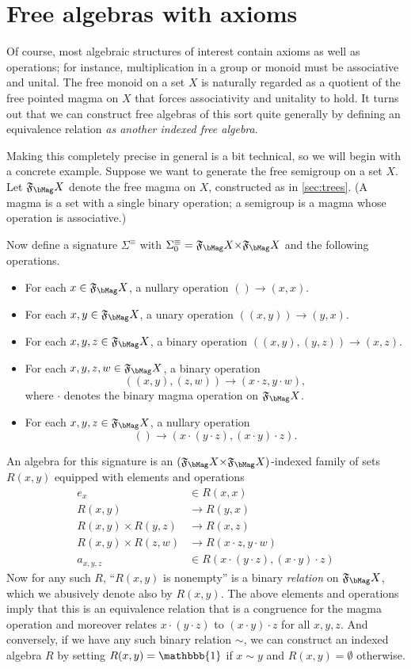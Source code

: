 \documentclass{book}
\def\sig{\Sigma}
\def\equivsym{\mathord{\equiv}}
\newcommand{\F}[1]{\mathfrak{F}_{#1}}
\def\unit{\mathbbb{1}}%
\begin{document}
\section{Free algebras with axioms}
\label{sec:axioms}

Of course, most algebraic structures of interest contain axioms as well as operations; for instance, multiplication in a group or monoid must be associative and unital.
The free monoid on a set $X$ is naturally regarded as a quotient of the free pointed magma on $X$ that forces associativity and unitality to hold.
It turns out that we can construct free algebras of this sort quite generally by defining an equivalence relation \emph{as another indexed free algebra}.

Making this completely precise in general is a bit technical, so we will begin with a concrete example.
Suppose we want to generate the free semigroup on a set $X$.
Let $\F\bMag X$ denote the free magma on $X$, constructed as in \cref{sec:trees}.
(A magma is a set with a single binary operation; a semigroup is a magma whose operation is associative.)

Now define a signature $\sig^{\equivsym}$ with $\sig^{\equivsym}_0 = \F\bMag X\times \F\bMag X$ and the following operations.
\begin{itemize}
\item For each $x\in \F\bMag X$, a nullary operation $() \to (x,x)$.
\item For each $x,y\in \F\bMag X$, a unary operation $((x,y)) \to (y,x)$.
\item For each $x,y,z\in \F\bMag X$, a binary operation $((x,y),(y,z)) \to (x,z)$.
\item For each $x,y,z,w\in \F\bMag X$, a binary operation \[((x,y),(z,w)) \to (x\cdot z,y\cdot w),\] where $\cdot$ denotes the binary magma operation on $\F\bMag X$.
\item For each $x,y,z\in \F\bMag X$, a nullary operation \[() \to (x\cdot (y\cdot z),(x\cdot y)\cdot z).\]
\end{itemize}
An algebra for this signature is an $(\F\bMag X\times \F\bMag X)$-indexed family of sets $R(x,y)$ equipped with elements and operations
\begin{align*}
  e_x &\in R(x,x)\\
  R(x,y) &\to R(y,x)\\
  R(x,y)\times R(y,z) &\to R(x,z)\\
  R(x,y) \times R(z,w) &\to R(x\cdot z,y\cdot w)\\
  a_{x,y,z} &\in R(x\cdot (y\cdot z),(x\cdot y)\cdot z)
\end{align*}
Now for any such $R$, ``$R(x,y)$ is nonempty'' is a binary \emph{relation} on $\F\bMag X$, which we abusively denote also by $R(x,y)$.
The above elements and operations imply that this is an equivalence relation that is a congruence for the magma operation and moreover relates $x\cdot (y\cdot z)$ to $(x\cdot y)\cdot z$ for all $x,y,z$.
And conversely, if we have any such binary relation $\sim$, we can construct an indexed algebra $R$ by setting $R(x,y) = \unit$ if $x\sim y$ and $R(x,y)=\emptyset$ otherwise.
\end{document}
